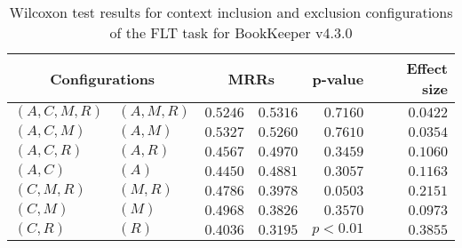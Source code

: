 
\begin{table}
\begin{spacing}{1.2}
\centering
\caption{Wilcoxon test results for context inclusion and exclusion configurations of the FLT task for BookKeeper v4.3.0}
\label{table:versus-wilcox-bookkeeper-flt-context}
\begin{tabular}{ll|rr|rr}
\toprule
      \multicolumn{2}{c|}{Configurations} &          \multicolumn{2}{c|}{MRRs} &       p-value & Effect size \\
\midrule
 $(A,C,M,R)$ &  $(A,M,R)$ & $0.5246$ & $0.5316$ & $0.7160$ &    $0.0422$ \\
   $(A,C,M)$ &    $(A,M)$ & $0.5327$ & $0.5260$ & $0.7610$ &    $0.0354$ \\
   $(A,C,R)$ &    $(A,R)$ & $0.4567$ & $0.4970$ & $0.3459$ &    $0.1060$ \\
     $(A,C)$ &      $(A)$ & $0.4450$ & $0.4881$ & $0.3057$ &    $0.1163$ \\
   $(C,M,R)$ &    $(M,R)$ & $0.4786$ & $0.3978$ & $0.0503$ &    $0.2151$ \\
     $(C,M)$ &      $(M)$ & $0.4968$ & $0.3826$ & $0.3570$ &    $0.0973$ \\
     $(C,R)$ &      $(R)$ & $0.4036$ & $0.3195$ & $p<0.01$ &    $0.3855$ \\
\bottomrule
\end{tabular}

\end{spacing}
\end{table}

